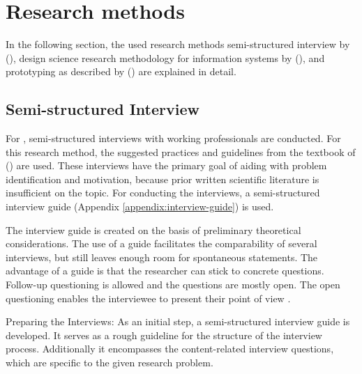 \section{Research methods}

In the following section,
the used research methods
semi-structured interview
by
\citeauthor{glaser2010experteninterviews} (\citeyear{glaser2010experteninterviews}),
design science research methodology for information systems
by
\citeauthor{designScienceResearchMethodologyForInformationSystemsResearch} (\citeyear{designScienceResearchMethodologyForInformationSystemsResearch}),
and prototyping as described
by
\citeauthor{riedlManagementInformatik2019} (\citeyear{riedlManagementInformatik2019})
are explained in detail.





\subsection{Semi-structured Interview}\label{methodology:interview}

For ,
semi-structured interviews with working professionals
are conducted.
For this research method,
the suggested practices and guidelines from
the textbook of
\citeauthor{glaser2010experteninterviews} (\citeyear{glaser2010experteninterviews})
are used.
These interviews have the primary goal of aiding with
problem identification and motivation,
because prior written scientific literature is insufficient on the topic.
For conducting the interviews,
a semi-structured interview guide (Appendix \ref{appendix:interview-guide}) is used.

The interview guide is created on the basis of preliminary theoretical considerations.
The use of a guide facilitates the comparability of several interviews,
but still leaves enough room for spontaneous statements.
The advantage of a guide is that the researcher can stick to concrete questions.
Follow-up questioning is allowed and the questions are mostly open.
The open questioning enables the interviewee to present their point of view
\autocite{berger2016wissenschaftliches}.



Preparing the Interviews:
As an initial step,
a semi-structured interview guide is developed.
It serves as a rough guideline for the structure of the interview process.
Additionally it encompasses the content-related interview questions,
which are specific to the given research problem.

